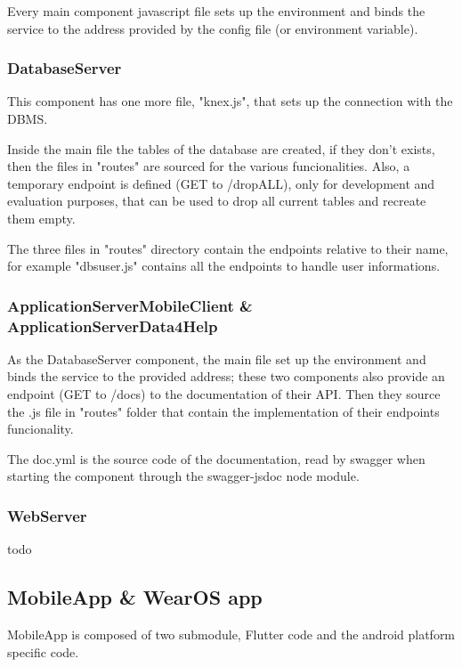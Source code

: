 \documentclass[../main.tex]{subfiles}
\begin{document}
Every main component javascript file sets up the environment and binds the service to the address provided by the config file (or environment variable).

\subsubsection{DatabaseServer}

This component has one more file, "knex.js", that sets up the connection with the DBMS.

Inside the main file the tables of the database are created, if they don't exists, then the files in "routes" are sourced for the various funcionalities. Also, a temporary endpoint is defined (GET to /dropALL), only for development and evaluation purposes, that can be used to drop all current tables and recreate them empty.

The three files in "routes" directory contain the endpoints relative to their name, for example "dbs\textunderscore user.js" contains all the endpoints to handle user informations.

\subsubsection{ApplicationServerMobileClient \& ApplicationServerData4Help}

As the DatabaseServer component, the main file set up the environment and binds the service to the provided address; these two components also provide an endpoint (GET to /docs) to the documentation of their API. Then they source the .js file in "routes" folder that contain the implementation of their endpoints funcionality.

The doc.yml is the source code of the documentation, read by swagger when starting the component through the swagger-jsdoc node module.

\subsubsection{WebServer}

todo

\subsection{MobileApp & WearOS app}
MobileApp is composed of two submodule, Flutter code and the android platform specific code.
\end{document}
